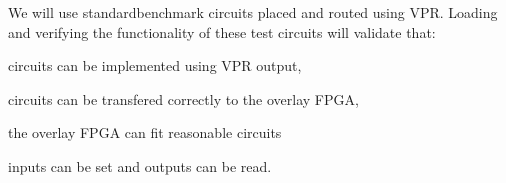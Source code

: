 We will use standard\citationneeded benchmark circuits placed and routed using VPR.
Loading and verifying the functionality of these test circuits will validate that:
\begin{itemlist}
\item circuits can be implemented using VPR output,
\item circuits can be transfered correctly to the overlay FPGA,
\item the overlay FPGA can fit reasonable circuits
\item inputs can be set and outputs can be read.
\end{itemlist}



